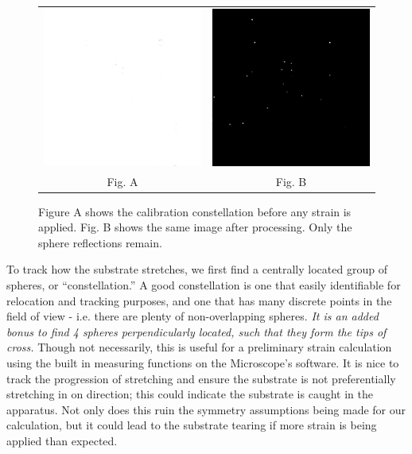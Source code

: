   \begin{figure}[h]
  		\label{fig:TDpreandpost}
  	\begin{tabular}{cc}
  		\includegraphics[width= .48\linewidth]{Chapters/Figures/1xzoom_constellation_zeroStrain.png} & \includegraphics[width= .48\linewidth]{Chapters/Figures/1xzoom_constellation_zeroStrain_supercontrast.png}\\
  		Fig. A & Fig. B
  			\end{tabular}
  \caption[Bright-field pre and post image processing]{Figure A shows the calibration constellation before any strain is applied. Fig. B shows the same image after processing. Only the sphere reflections remain.}
\end{figure}

To track how the substrate stretches, we first find a centrally located group of spheres, or ``constellation.'' A good constellation is one that easily identifiable for relocation and tracking purposes, and one that has many discrete points in the field of view - i.e. there are plenty of non-overlapping spheres. \emph{It is an added bonus to find 4 spheres perpendicularly located, such that they form the tips of cross.} Though not necessarily, this is useful for a preliminary strain calculation using the built in measuring functions on the Microscope's software. It is nice to track the progression of stretching and ensure the substrate is not preferentially stretching in on direction; this could indicate the substrate is caught in the apparatus. Not only does this ruin the symmetry assumptions being made for our calculation, but it could lead to the substrate tearing if more strain is being applied than expected.


